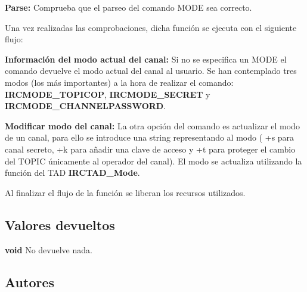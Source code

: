 \begin{DoxyItemize}
\item {\bfseries Parse\+:} Comprueba que el parseo del comando M\+O\+DE sea correcto. 
\end{DoxyItemize}

Una vez realizadas las comprobaciones, dicha función se ejecuta con el siguiente flujo\+:


\begin{DoxyItemize}
\item {\bfseries Información del modo actual del canal\+:} Si no se especifica un M\+O\+DE el comando devuelve el modo actual del canal al usuario. Se han contemplado tres modos (los más importantes) a la hora de realizar el comando\+: {\bfseries I\+R\+C\+M\+O\+D\+E\+\_\+\+T\+O\+P\+I\+C\+OP}, {\bfseries I\+R\+C\+M\+O\+D\+E\+\_\+\+S\+E\+C\+R\+ET} y {\bfseries I\+R\+C\+M\+O\+D\+E\+\_\+\+C\+H\+A\+N\+N\+E\+L\+P\+A\+S\+S\+W\+O\+RD}.  
\item {\bfseries Modificar modo del canal\+:} La otra opción del comando es actualizar el modo de un canal, para ello se introduce una string representando al modo ( +s para canal secreto, +k para añadir una clave de acceso y +t para proteger el cambio del T\+O\+P\+IC únicamente al operador del canal). El modo se actualiza utilizando la función del T\+AD {\bfseries I\+R\+C\+T\+A\+D\+\_\+\+Mode}.  
\end{DoxyItemize}

Al finalizar el flujo de la función se liberan los recursos utilizados.\hypertarget{server_command_mode_return_mode}{}\subsection{Valores devueltos}\label{server_command_mode_return_mode}

\begin{DoxyItemize}
\item {\bfseries void} No devuelve nada. 
\end{DoxyItemize}\hypertarget{server_command_mode_authors_mode}{}\subsection{Autores}\label{server_command_mode_authors_mode}

